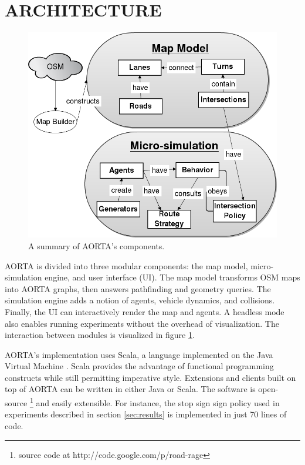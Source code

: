 \documentclass[letterpaper, 10 pt, conference]{ieeeconf}  %
\begin{document}

\section{ARCHITECTURE}
\label{sec:arch}

\begin{figure}
  \centering \includegraphics[scale=0.3]{architecture.png}
  \caption{A summary of AORTA's components.}
  \label{fig:arch}
  \vspace{-20pt}
\end{figure}

AORTA is divided into three modular components: the map model, micro-simulation
engine, and user interface (UI). The map model transforms OSM maps into AORTA
graphs, then answers pathfinding and geometry queries. The simulation engine
adds a notion of agents, vehicle dynamics, and collisions. Finally, the UI can
interactively render the map and agents. A headless mode also enables running
experiments without the overhead of visualization. The interaction between
modules is visualized in figure \ref{fig:arch}.

AORTA's implementation uses Scala, a language implemented on the Java Virtual
Machine \cite{scala}. Scala provides the advantage of functional programming
constructs while still permitting imperative style.  Extensions and clients
built on top of AORTA can be written in either Java or Scala. The software is
open-source \footnote{source code at http://code.google.com/p/road-rage} and
easily extensible. For instance, the stop sign sign policy used in experiments
described in section \ref{sec:results} is implemented in just 70 lines of code.
\end{document}
